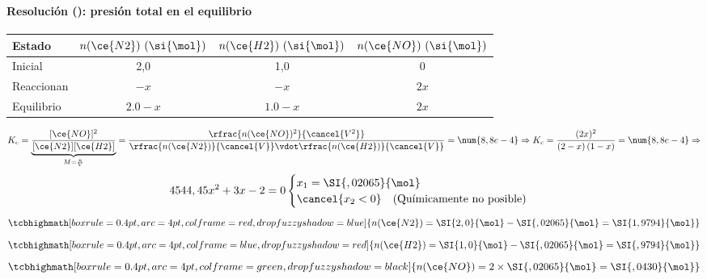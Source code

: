 \begin{frame}
	\frametitle{\ejerciciocmd}
	\framesubtitle{Resolución (): presión total en el equilibrio}
	\quad{}
	\begin{center}
		\begin{tabular}{lSSS}
			\toprule
				Estado		& {$n(\ce{N2})~(\si{\mol})$}	&  {$n(\ce{H2})~(\si{\mol})$}	&  {$n(\ce{NO})~(\si{\mol})$}	\\
			\midrule
				Inicial		&            2,0				&	1,0 						&	0							\\
				Reaccionan	&			{$-x$}				&	{$-x$}						&	{$2x$}						\\
				Equilibrio	&			{$\num{2,0}-x$}		&	{$\num{1,0}-x$}				&	{$2x$}						\\
			\bottomrule
		\end{tabular}
	\end{center}
	$$
		K_c=\underbrace{\frac{[\ce{NO}]^2}{[\ce{N2}][\ce{H2}]}}_{M=\frac{n}{V}}=\frac{\rfrac{n(\ce{NO})^2}{\cancel{V^2}}}{\rfrac{n(\ce{N2})}{\cancel{V}}\vdot \rfrac{n(\ce{H2})}{\cancel{V}}}=\num{8,8e-4}\Rightarrow
		K_c = \frac{(2x)^2}{\left(2-x\right)\left(1-x\right)}=\num{8,8e-4}\Rightarrow
	$$
	$$
		 4544,45x^2 + 3x -2 =0
		\begin{cases}
			x_1 = \SI{,02065}{\mol}\\
			\cancel{x_2 < 0}\quad\text{(Químicamente no posible)}
		\end{cases}
	$$
	$$
		\tcbhighmath[boxrule=0.4pt,arc=4pt,colframe=red,drop fuzzy shadow=blue]{n(\ce{N2}) = \SI{2,0}{\mol} - \SI{,02065}{\mol} = \SI{1,9794}{\mol}}
	$$
	$$
		\tcbhighmath[boxrule=0.4pt,arc=4pt,colframe=blue,drop fuzzy shadow=red]{n(\ce{H2}) = \SI{1,0}{\mol} - \SI{,02065}{\mol} = \SI{,9794}{\mol}}
	$$
	$$
		\tcbhighmath[boxrule=0.4pt,arc=4pt,colframe=green,drop fuzzy shadow=black]{n(\ce{NO}) = 2\times\SI{,02065}{\mol} = \SI{,0430}{\mol}}
	$$
\end{frame}